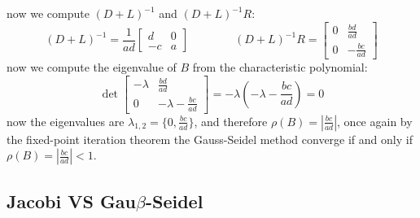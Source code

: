 \documentclass[11pt]{article}
\begin{document}
now we compute \((D+L)^{-1}\) and \((D+L)^{-1}R\):
\[(D+L)^{-1} = \frac{1}{ad}\begin{bmatrix}d & 0 \\ -c & a\end{bmatrix}\qquad\qquad (D+L)^{-1}R=\begin{bmatrix}0 & \frac{bd}{ad} \\ 0 & -\frac{bc}{ad}\end{bmatrix}\]
now we compute the eigenvalue of \(B\) from the characteristic
polynomial:
\[\det\begin{bmatrix}-\lambda & \frac{bd}{ad} \\ 0 & -\lambda - \frac{bc}{ad} \end{bmatrix}=-\lambda (-\lambda - \frac{bc}{ad})=0\]
now the eigenvalues are \(\lambda_{1,2} = \{0,\frac{bc}{ad}\}\), and
therefore \(\rho(B)=|\frac{bc}{ad}|\), once again by the fixed-point
iteration theorem the Gauss-Seidel method converge if and only if
\(\rho(B)=|\frac{bc}{ad}|<1\).

    \subsection{\texorpdfstring{Jacobi VS
Gau\(\beta\)-Seidel}{Jacobi VS Gau\textbackslash{}beta-Seidel}}\label{jacobi-vs-gaubeta-seidel}
\end{document}
